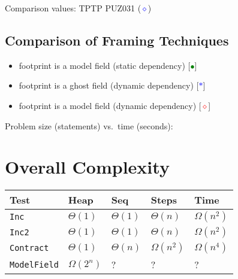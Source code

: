 \documentclass[a4paper]{article}
\begin{document}
Comparison values: TPTP PUZ031 (\textcolor{blue}{$\diamond$})

\subsection{Comparison of Framing Techniques}

\begin{itemize}
  \item footprint is a model field (static dependency) 
	[\textcolor{green}{$\bullet$}]
  \item footprint is a ghost field (dynamic dependency)
	[\textcolor{blue}{$\ast$}]
  \item footprint is a model field (dynamic dependency)
	[\textcolor{red}{$\diamond$}]
\end{itemize}

Problem size (statements) vs.\ time (seconds):\\


\section{Overall Complexity}
\begin{tabular}{|l|l|l|l|l|} \hline
Test & Heap & Seq & Steps & Time \\ \hline
\texttt{Inc}& $\Theta(1)$ & $\Theta(1)$ & $\Theta(n)$ & $\Omega(n^2)$ \\
\texttt{Inc2} & $\Theta(1)$ & $\Theta(1)$ & $\Theta(n)$ & $\Omega(n^2)$ \\
\texttt{Contract} & $\Theta(1)$ & $\Theta(n)$ 
	& $\Omega(n^2)$ & $\Omega(n^4)$ \\
\texttt{ModelField} & $\Omega(2^n)$ & ? & ? & ? \\
\hline
\end{tabular}
\end{document}
